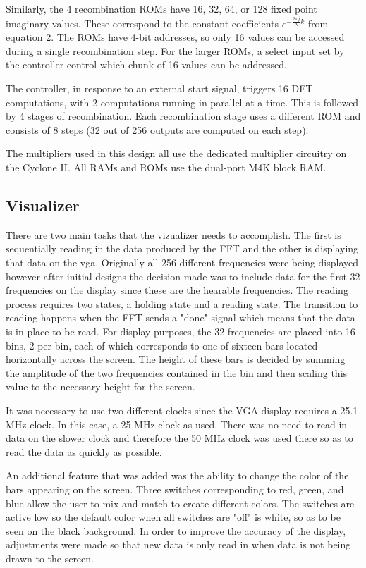 \documentclass{article}
\begin{document}
Similarly, the 4 recombination ROMs have 16, 32, 64, or 128 fixed point
imaginary values. These correspond to the constant coefficients
\(e^{-\frac{2\pi j}{N}k}\) from equation 2. The ROMs have 4-bit addresses, 
so only 16 values can be accessed during a single recombination step. 
For the larger ROMs, a select input set by the controller control which 
chunk of 16 values can be addressed.

The controller, in response to an external start signal, triggers
16 DFT computations, with 2 computations running in parallel at a time.
This is followed by 4 stages of recombination. Each recombination stage
uses a different ROM and consists of 8 steps (32 out of 256 outputs are
computed on each step).

The multipliers used in this design all use the dedicated multiplier 
circuitry on the Cyclone II. All RAMs and ROMs use the dual-port M4K
block RAM.
	
\subsection{Visualizer} 

There are two main tasks that the vizualizer needs to accomplish.  
The first is sequentially reading in the data produced by the FFT and the 
other is displaying that data on the vga.  Originally all 256 different 
frequencies were being displayed however after initial designs the decision 
made was to include data for the first 32 frequencies on the display since 
these are the hearable frequencies.  The reading process requires two states, 
a holding state and a reading state.  The transition to reading happens when 
the FFT sends a "done" signal which means that the data is in place to be read.  
For display purposes, the 32 frequencies are placed into 16 bins, 2 per bin, 
each of which corresponds to one of sixteen bars located horizontally across 
the screen.  The height of these bars is decided by summing the amplitude of 
the two frequencies contained in the bin and then scaling this value to the 
necessary height for the screen.

It was necessary to use two different clocks since the VGA display requires a
25.1 MHz clock. In this case, a 25 MHz clock as used.  There was no need to read
in data on the slower clock and therefore the 50 MHz clock was used there so
as to read the data as quickly as possible. 

An additional feature that was added was the ability to change the color of the 
bars appearing on the screen.  Three switches corresponding to red, green, and 
blue allow the user to mix and match to create different colors.  The switches 
are active low so the default color when all switches are "off" is white, so 
as to be seen on the black background.  In order to improve the accuracy of the 
display, adjustments were made so that new data is only read in when data is 
not being drawn to the screen.
\end{document}
